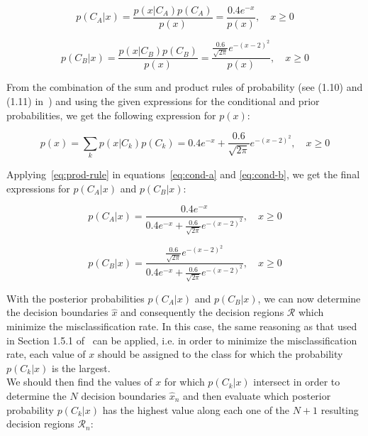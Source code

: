 \documentclass[paper=a4, fontsize=11pt]{scrartcl} %
\numberwithin{equation}{section} %
\numberwithin{figure}{section} %
\numberwithin{table}{section} %
\begin{document}
\begin{equation}
    p(C_A|x) = \frac{p(x|C_A) p(C_A)}{p(x)} = \frac{\text{0.4}e^{-x}}{p(x)}, \quad x \geq 0
    \label{eq:cond-a}
\end{equation}

\begin{equation}
    p(C_B|x) = \frac{p(x|C_B) p(C_B)}{p(x)} = \frac{\frac{\text{0.6}}{\sqrt{2\pi}}e^{-(x-2)^2}}{p(x)}, \quad x \geq 0
    \label{eq:cond-b}
\end{equation}

From the combination of the sum and product rules of probability (see (1.10) and 
(1.11) in~\cite{Bishop2006}) and using the given expressions for the conditional 
and prior probabilities, we get the following expression for $p(x)$:

\begin{equation}
    p(x) = \sum\limits_{k} p(x|C_k) p(C_k) = \text{0.4}e^{-x} + \frac{\text{0.6}}{\sqrt{2\pi}}e^{-(x-2)^2}, \quad x \geq 0
    \label{eq:prod-rule}
\end{equation}

Applying~\ref{eq:prod-rule} in equations~\ref{eq:cond-a} and \ref{eq:cond-b}, 
we get the final expressions for $p(C_A|x)$ and $p(C_B|x)$:

\begin{equation}
    p(C_A|x) = \frac{\text{0.4}e^{-x}}{\text{0.4}e^{-x} + \frac{\text{0.6}}{\sqrt{2\pi}}e^{-(x-2)^2}}, \quad x \geq 0
    \label{eq:cond-a-final}
\end{equation}

\begin{equation}
    p(C_B|x) = \frac{\frac{\text{0.6}}{\sqrt{2\pi}}e^{-(x-2)^2}}{\text{0.4}e^{-x} + \frac{\text{0.6}}{\sqrt{2\pi}}e^{-(x-2)^2}}, \quad x \geq 0
    \label{eq:cond-b-final}
\end{equation}

With the posterior probabilities $p(C_A|x)$ and $p(C_B|x)$, we can now 
determine the decision boundaries $\hat{x}$ and consequently the decision regions 
$\mathcal{R}$ which minimize the misclassification rate. In this case, the same 
reasoning as that used in Section 1.5.1 of~\cite{Bishop2006} can be applied, 
i.e. in order to minimize the misclassification rate, each value of $x$ 
should be assigned to the class for which the probability $p(C_k|x)$ is the 
largest.\\ 

We should then find the values of $x$ for which 
$p(C_k|x)$ intersect in order to determine the $N$ decision boundaries 
$\hat{x}_n$ and then evaluate which posterior probability $p(C_k|x)$ has the 
highest value along each one of the $N+1$ resulting decision regions 
$\mathcal{R}_n$:
\end{document}
